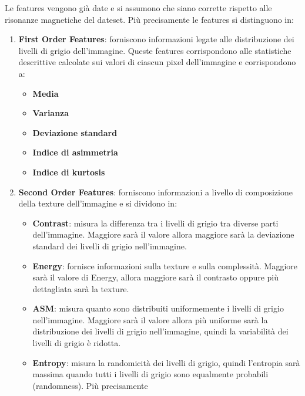 Le features vengono già date e si assumono che siano corrette rispetto alle 
risonanze magnetiche del dateset\cite{explanation-features}. Più precisamente 
le features si distinguono in:
\begin{enumerate}
      \item \textbf{First Order Features}: forniscono informazioni legate alle
            distribuzione dei livelli di grigio dell'immagine. Queste features
            corrispondono alle statistiche descrittive calcolate sui valori di
            ciascun pixel dell'immagine e corrispondono a:
            \begin{itemize}
                  \item \textbf{Media}
                  \item \textbf{Varianza}
                  \item \textbf{Deviazione standard}
                  \item \textbf{Indice di asimmetria}
                  \item \textbf{Indice di kurtosis}
            \end{itemize}
      \item \textbf{Second Order Features}: forniscono informazioni a livello di
            composizione della texture dell'immagine e si dividono in:
            \begin{itemize}
                  \item \textbf{Contrast}: misura la differenza tra i livelli di 
                  grigio tra diverse parti dell'immagine. Maggiore sarà il valore 
                  allora maggiore sarà la deviazione standard dei livelli di grigio
                  nell'immagine.
                  \item \textbf{Energy}: fornisce informazioni sulla texture e
                  sulla complessità. Maggiore sarà il valore di Energy, allora 
                  maggiore sarà il contrasto oppure più dettagliata sarà la texture.
                  \item \textbf{ASM}: misura quanto sono distribuiti uniformemente i
                  livelli di grigio nell'immagine. Maggiore sarà il valore allora
                  più uniforme sarà la distribuzione dei livelli di grigio nell'immagine,
                  quindi la variabilità dei livelli di grigio è ridotta.
                  \item \textbf{Entropy}: misura la randomicità dei livelli di
                  grigio, quindi l'entropia sarà massima quando tutti i livelli 
                  di grigio sono equalmente probabili (randomness). Più precisamente

\end{itemize}
\end{enumerate}
